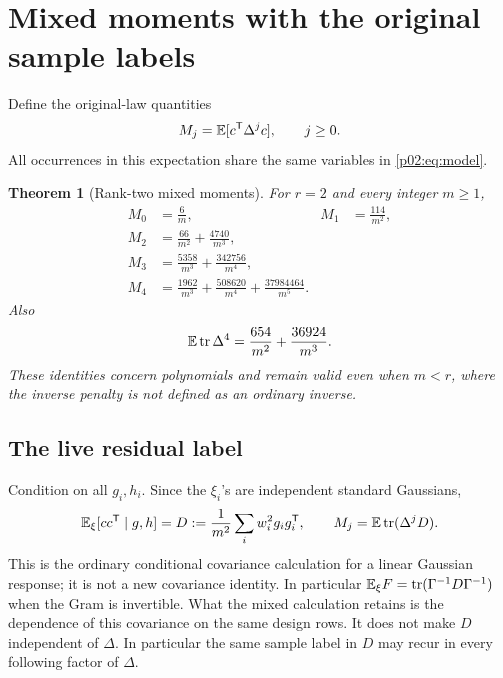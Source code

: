 \documentclass[11pt]{article}
\numberwithin{equation}{section}
\newtheorem{theorem}{Theorem}[section]
\theoremstyle{definition}\newtheorem{definition}[theorem]{Definition}
\theoremstyle{remark}\newtheorem{remark}[theorem]{Remark}
\newcommand{\tr}{\operatorname{tr}}\newcommand{\Ent}{\operatorname{Ent}}
\begin{document}
\par{}
\section{Mixed moments with the original sample labels}\label{p02:sec:moments}
Define the original-law quantities
\[
 M_j=\mathbb E[c^{\mathsf T}\Delta^j c],\qquad j\ge0.
\]
All occurrences in this expectation share the same variables in \eqref{p02:eq:model}.

\begin{theorem}[Rank-two mixed moments]\label{p02:thm:mixed}
For \(r=2\) and every integer \(m\ge1\),
\begin{align*}
 M_0&=\frac6m, &M_1&=\frac{114}{m^2},\\
 M_2&=\frac{66}{m^2}+\frac{4740}{m^3},\\
 M_3&=\frac{5358}{m^3}+\frac{342756}{m^4},\\
 M_4&=\frac{1962}{m^3}+\frac{508620}{m^4}+\frac{37984464}{m^5}.
\end{align*}
Also
\begin{equation}\label{p02:eq:tailmoment}
 \E\tr \Delta^4=\frac{654}{m^2}+\frac{36924}{m^3}.
\end{equation}
These identities concern polynomials and remain valid even when \(m<r\), where the inverse penalty is not defined as an ordinary inverse.
\end{theorem}

\subsection{The live residual label}
Condition on all \(g_i,h_i\). Since the \(\xi_i\)'s are independent standard Gaussians,
\begin{equation}\label{p02:eq:marked}
 \E_{\xi}[cc^{\mathsf T}\mid g,h]
 =D:=\frac1{m^2}\sum_i w_i^2g_ig_i^{\mathsf T},\qquad
 M_j=\E\tr(\Delta^jD).
\end{equation}
This is the ordinary conditional covariance calculation for a linear
Gaussian response; it is not a new covariance identity. In particular
$\E_\xi F=\tr(\Gamma^{-1}D\Gamma^{-1})$ when the Gram is invertible.
What the mixed calculation retains is the dependence of this covariance
on the same design rows. It does not make \(D\) independent of \(\Delta\). In particular the same sample label in \(D\) may recur in every following factor of \(\Delta\).
\end{document}
